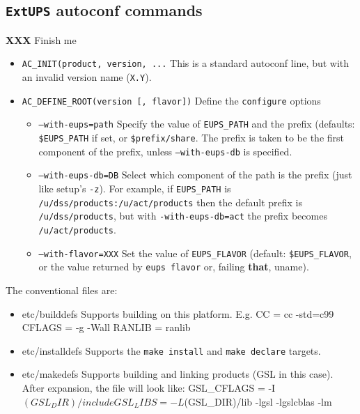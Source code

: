\documentclass{article}
\newcommand{\XXX}[1]{\textbf{XXX} #1}
\newcommand{\code}[1]{\texttt{#1}}
\newcommand{\eups}{\code{ExtUPS}\xspace}
\let\overbatim=\verbatim
\let\oendverbatim=\endverbatim
\renewenvironment{verbatim}
{\center\minipage{16cm}\overbatim}
{\oendverbatim\endminipage\endcenter}
\begin{document}
\subsection{\eups autoconf commands}
\label{autoconfReference}

\XXX{Finish me}

\begin{itemize}
  \item{\code{AC\_INIT(product, version, ...}}
    This is a standard autoconf line, but with an invalid version name (\code{X.Y}).

  \item{\code{AC\_DEFINE\_ROOT(version [, flavor])}}
    Define the \code{configure} options
    \begin{itemize}
      \item{\code{--with-eups=path}}
        Specify the value of \code{EUPS\_PATH} and the prefix
        (defaults: \code{\$EUPS\_PATH} if set, or \code{\$prefix/share}. The
	prefix is taken to be the first component of the prefix, unless
	\code{--with-eups-db} is specified.

	\item{\code{--with-eups-db=DB}}
	  Select which component of the path is the prefix (just like setup's \code{-z}).
	  For example, if \code{EUPS\_PATH} is
    \code{/u/dss/products:/u/act/products} then the default prefix is
    \code{/u/dss/products}, but with \code{\--with-eups-db=act} the
    prefix becomes \code{/u/act/products}.

	\item{\code{--with-flavor=XXX}}
        Set the value of \code{EUPS\_FLAVOR}
        (default: \code{\$EUPS\_FLAVOR}, or the value returned by \code{eups flavor}
	or, failing \textbf{that}, uname).
    \end{itemize}
\end{itemize}

The conventional files are:
\begin{itemize}
   \item{etc/builddefs}
     Supports building on this platform. E.g.
\begin{verbatim}
CC = cc -std=c99
CFLAGS = -g -Wall
RANLIB = ranlib
\end{verbatim}

   \item{etc/installdefs}
     Supports the \code{make install} and \code{make declare} targets.

   \item{etc/makedefs}
     Supports building and linking products (GSL in this case). After
     expansion, the file will look like:
\begin{verbatim}
GSL_CFLAGS = -I$(GSL_DIR)/include
GSL_LIBS = -L$(GSL_DIR)/lib -lgsl -lgslcblas -lm
\end{verbatim}
\end{itemize}
\end{document}
